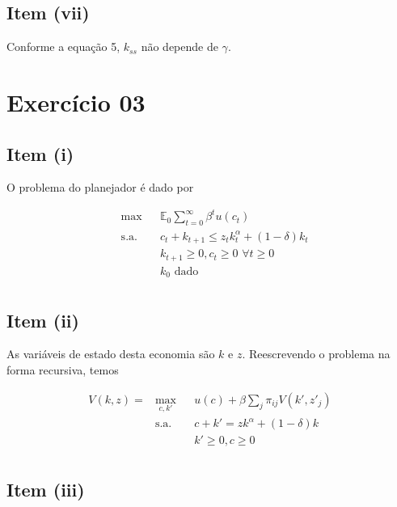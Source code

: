 \documentclass{article}
\begin{document}
\subsection*{Item (vii)}

Conforme a equação 5, $k_{ss}$ não depende de $\gamma$.

\section*{Exercício 03}

\subsection*{Item (i)}

O problema do planejador é dado por 

\begin{equation}
\begin{aligned}
& \max & & \mathbb{E}_0 \sum_{t=0}^{\infty} \beta^t u(c_t) \\
& \text{s.a.} & &  c_t + k_{t+1} \leq z_t k_t^\alpha + (1-\delta) k_t \\
& & &  k_{t+1} \geq 0, c_t \geq 0 \,\, \forall t \geq 0  \\
& & &  k_0 \text{ dado} \\
\end{aligned}
\end{equation}

\subsection*{Item (ii)}

As variáveis de estado desta economia são $k$ e $z$. Reescrevendo o problema na forma recursiva, temos

\begin{equation}
\begin{aligned}
V(k, z) = & \max_{c, k'} & & u(c) + \beta \sum_j \pi_{ij} V(k', z'_j) \\
& \text{s.a.} & &  c + k' = z k^\alpha + (1-\delta) k \\
& & &  k' \geq 0, c \geq 0 \,\, \\
\end{aligned}
\end{equation}

\subsection*{Item (iii)}
\end{document}
